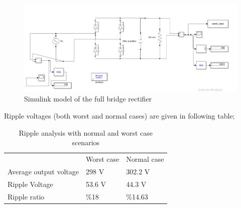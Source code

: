 \documentclass[fleqn, a4paper]{report}
\begin{document}
\begin{figure}[H]
  \includegraphics[width=\linewidth]{Simulink_modelRC_load.PNG}
  \caption{Simulink model of the full bridge rectifier}
  \label{fig:simulink3}
\end{figure}
Ripple voltages (both worst and normal cases) are given in following table;

\begin{table}[H]
\centering
\begin{tabular}{lll}
                       & Worst case & Normal case \\
Average output voltage & 298 V      & 302.2 V     \\
Ripple Voltage         & 53.6 V     & 44.3 V      \\
Ripple ratio           & \%18       & \%14.63    
\end{tabular}
\caption{Ripple analysis with normal and worst case scenarios}
\end{table}
\end{document}

